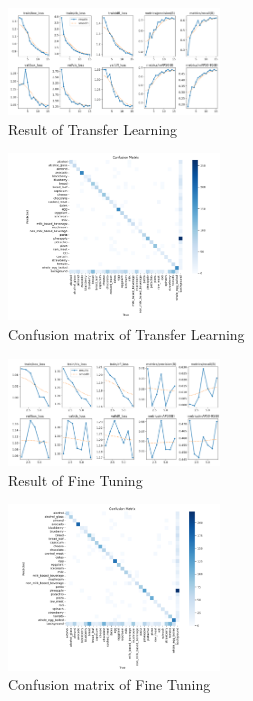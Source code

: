 \documentclass[10pt,twocolumn,letterpaper]{article}
\begin{document}
\begin{figure}[htbp]
    \centering
    \includegraphics[width=0.5\textwidth]{4471_transfer_learning.png}
    \caption{Result of Transfer Learning}
    \label{fig:yourlabel}
\end{figure}
\begin{figure}[htbp]
    \centering
    \includegraphics[width=0.5\textwidth]{4471_transfer_confusion.png}
    \caption{Confusion matrix of Transfer Learning}
    \label{fig:yourlabel}
\end{figure}
\begin{figure}[htbp]
    \centering
    \includegraphics[width=0.5\textwidth]{4471_fine_tuning.png}
    \caption{Result of Fine Tuning}
    \label{fig:yourlabel}
\end{figure}
\begin{figure}[htbp]
    \centering
    \includegraphics[width=0.5\textwidth]{4471_finetuning_confusion.png}
    \caption{Confusion matrix of Fine Tuning}
    \label{fig:yourlabel}
\end{figure}
\end{document}
